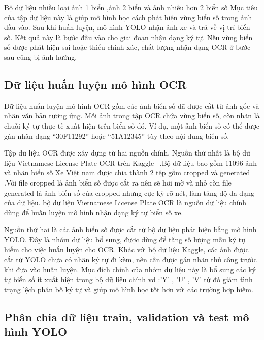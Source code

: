 \documentclass[13pt,a4paper]{report}
\begin{document}
Bộ dữ liệu nhiều loại ảnh 1 biển ,ảnh 2  biển và ảnh nhiều hơn 2 biển số 
Mục tiêu của tập dữ liệu này là giúp mô hình học cách phát hiện vùng biển số trong ảnh đầu vào. Sau khi huấn luyện, mô hình YOLO nhận ảnh xe và trả về vị trí biển số. Kết quả này là bước đầu vào cho giai đoạn nhận dạng ký tự. Nếu vùng biển số được phát hiện sai hoặc thiếu chính xác, chất lượng nhận dạng OCR ở bước sau cũng bị ảnh hưởng.



\subsection{Dữ liệu huấn luyện mô hình OCR}

Dữ liệu huấn luyện mô hình OCR gồm các ảnh biển số đã được cắt từ ảnh gốc và nhãn văn bản tương ứng. Mỗi ảnh trong tập OCR chứa vùng biển số, còn nhãn là chuỗi ký tự thực tế xuất hiện trên biển số đó. Ví dụ, một ảnh biển số có thể được gán nhãn dạng “30F11292” hoặc “51A12345” tùy theo nội dung biển số.

Tập dữ liệu OCR được xây dựng từ hai nguồn chính. Nguồn thứ nhất là bộ dữ liệu Vietnamese License Plate OCR trên Kaggle ~\cite{kaggle_vietnamese_plate_ocr}.Bộ dữ liệu bao gồm 11096 ảnh và nhãn biển số Xe Việt nam được chia thành 2 tệp gồm cropped và generated .Với file cropped là ảnh biển số được cắt ra nên sẽ hơi mờ và nhỏ còn file generated là ảnh biến số của cropped nhưng cực kỳ rõ nét, làm tăng độ đa dạng của dữ liệu. bộ dữ liệu Vietnamese License Plate OCR là nguồn dữ liệu chính dùng để huấn luyện mô hình nhận dạng ký tự biển số xe. 

Nguồn thứ hai là các ảnh biển số được cắt từ bộ dữ liệu phát hiện bằng mô hình YOLO. Đây là nhóm dữ liệu bổ sung, được dùng để tăng số lượng mẫu ký tự hiếm cho việc huấn luyện cho OCR. Khác với bộ dữ liệu Kaggle, các ảnh được cắt từ YOLO chưa có nhãn ký tự đi kèm, nên cần được gán nhãn thủ công trước khi đưa vào huấn luyện. Mục đích chính của nhóm dữ liệu này là bổ sung các ký tự biển số ít xuất hiện trong bộ dữ liệu chính vd :'Y' , 'U' , 'V' từ đó giảm tình trạng lệch phân bố ký tự và giúp mô hình học tốt hơn với các trường hợp hiếm.



\subsection{Phân chia dữ liệu train, validation và test mô hình YOLO}
\end{document}
